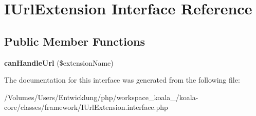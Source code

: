 \hypertarget{interface_i_url_extension}{
\section{IUrlExtension Interface Reference}
\label{interface_i_url_extension}
}
\subsection*{Public Member Functions}
\begin{DoxyCompactItemize}
\item 
\hypertarget{interface_i_url_extension_a6eb05303b5a61f6475597c3f21214362}{
{\bfseries canHandleUrl} (\$extensionName)}
\label{interface_i_url_extension_a6eb05303b5a61f6475597c3f21214362}

\end{DoxyCompactItemize}


The documentation for this interface was generated from the following file:\begin{DoxyCompactItemize}
\item 
/Volumes/Users/Entwicklung/php/workspace\_\-koala\_/koala-\/core/classes/framework/IUrlExtension.interface.php\end{DoxyCompactItemize}
